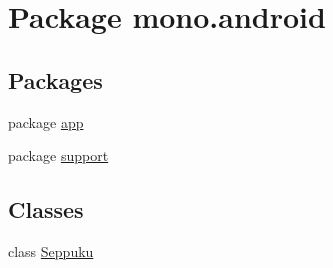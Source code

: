 \hypertarget{namespacemono_1_1android}{
\section{Package mono.android}
\label{namespacemono_1_1android}
}
\subsection*{Packages}
\begin{CompactItemize}
\item 
package \hyperlink{namespacemono_1_1android_1_1app}{app}
\item 
package \hyperlink{namespacemono_1_1android_1_1support}{support}
\end{CompactItemize}
\subsection*{Classes}
\begin{CompactItemize}
\item 
class \hyperlink{classmono_1_1android_1_1_seppuku}{Seppuku}
\end{CompactItemize}
